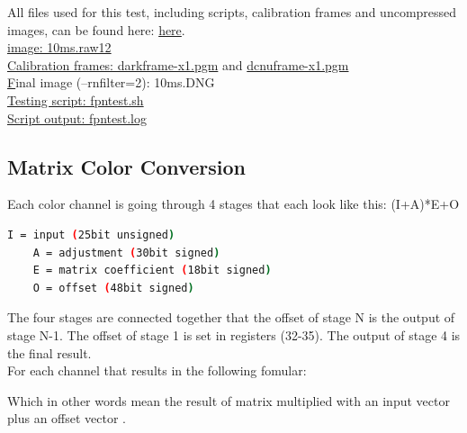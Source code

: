 All files used for this test, including scripts, calibration frames and uncompressed images, can be found here: \href{http://files.apertus.org/AXIOM-Beta/snapshots/pattern-noise/}{here}.\\

\href{http://files.apertus.org/AXIOM-Beta/snapshots/pattern-noise/10ms.raw12Raw12}{image: 10ms.raw12}\\
\href{http://files.apertus.org/AXIOM-Beta/snapshots/pattern-noise/darkframe-x1.pgm}{Calibration frames: darkframe-x1.pgm} and \href{http://files.apertus.org/AXIOM-Beta/snapshots/pattern-noise/dcnuframe-x1.pgm}{dcnuframe-x1.pgm}\\
\href{http://files.apertus.org/AXIOM-Beta/snapshots/pattern-noise/10ms.DNG}Final image (--rnfilter=2): {10ms.DNG}\\
\href{http://files.apertus.org/AXIOM-Beta/snapshots/pattern-noise/fpntest.sh}{Testing script: fpntest.sh}\\
\href{http://files.apertus.org/AXIOM-Beta/snapshots/pattern-noise/fpntest.log}{Script output: fpntest.log}\\






\subsection{Matrix Color Conversion} %

Each color channel is going through 4 stages that each look like this: (I+A)*E+O 

\begin{lstlisting}[language=bash,morekeywords=$,keywordstyle=\bfseries,frame=none,xleftmargin=.25in,belowskip=2em, aboveskip=2em]
    I = input (25bit unsigned)
    A = adjustment (30bit signed)
    E = matrix coefficient (18bit signed)
    O = offset (48bit signed)
\end{lstlisting}

The four stages are connected together that the offset of stage N is the output of stage N-1. The offset of stage 1 is set in registers (32-35). The output of stage 4 is the final result.\\


For each channel that results in the following fomular: 


Which in other words mean the result of matrix  multiplied with an input vector  plus an offset vector .

